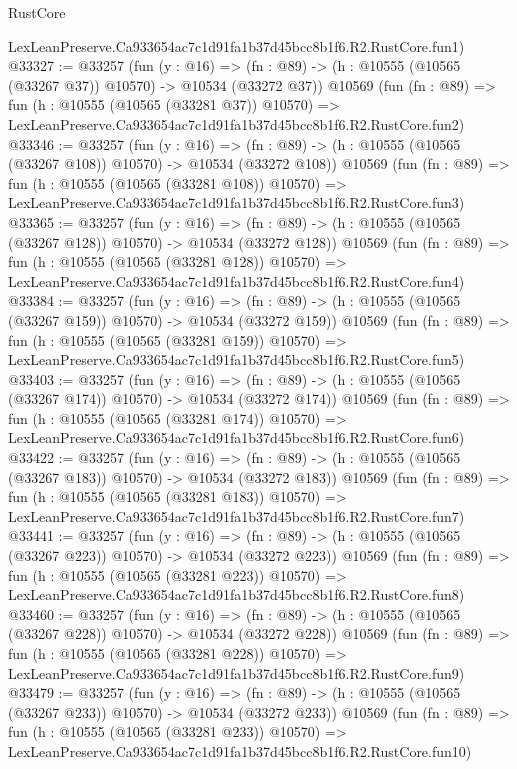 \begin{lexlean}{RustCore}
\begin{coremodule}
    LexLeanPreserve.Ca933654ac7c1d91fa1b37d45bcc8b1f6.R2.RustCore.fun1)
@33327 := @33257
    (fun (y : @16) =>
    (fn : @89) -> (h : @10555 (@10565 (@33267 @37)) @10570) -> @10534 (@33272 @37))
    @10569
    (fun (fn : @89) =>
    fun (h : @10555 (@10565 (@33281 @37)) @10570) =>
    LexLeanPreserve.Ca933654ac7c1d91fa1b37d45bcc8b1f6.R2.RustCore.fun2)
@33346 := @33257
    (fun (y : @16) =>
    (fn : @89) -> (h : @10555 (@10565 (@33267 @108)) @10570) -> @10534 (@33272 @108))
    @10569
    (fun (fn : @89) =>
    fun (h : @10555 (@10565 (@33281 @108)) @10570) =>
    LexLeanPreserve.Ca933654ac7c1d91fa1b37d45bcc8b1f6.R2.RustCore.fun3)
@33365 := @33257
    (fun (y : @16) =>
    (fn : @89) -> (h : @10555 (@10565 (@33267 @128)) @10570) -> @10534 (@33272 @128))
    @10569
    (fun (fn : @89) =>
    fun (h : @10555 (@10565 (@33281 @128)) @10570) =>
    LexLeanPreserve.Ca933654ac7c1d91fa1b37d45bcc8b1f6.R2.RustCore.fun4)
@33384 := @33257
    (fun (y : @16) =>
    (fn : @89) -> (h : @10555 (@10565 (@33267 @159)) @10570) -> @10534 (@33272 @159))
    @10569
    (fun (fn : @89) =>
    fun (h : @10555 (@10565 (@33281 @159)) @10570) =>
    LexLeanPreserve.Ca933654ac7c1d91fa1b37d45bcc8b1f6.R2.RustCore.fun5)
@33403 := @33257
    (fun (y : @16) =>
    (fn : @89) -> (h : @10555 (@10565 (@33267 @174)) @10570) -> @10534 (@33272 @174))
    @10569
    (fun (fn : @89) =>
    fun (h : @10555 (@10565 (@33281 @174)) @10570) =>
    LexLeanPreserve.Ca933654ac7c1d91fa1b37d45bcc8b1f6.R2.RustCore.fun6)
@33422 := @33257
    (fun (y : @16) =>
    (fn : @89) -> (h : @10555 (@10565 (@33267 @183)) @10570) -> @10534 (@33272 @183))
    @10569
    (fun (fn : @89) =>
    fun (h : @10555 (@10565 (@33281 @183)) @10570) =>
    LexLeanPreserve.Ca933654ac7c1d91fa1b37d45bcc8b1f6.R2.RustCore.fun7)
@33441 := @33257
    (fun (y : @16) =>
    (fn : @89) -> (h : @10555 (@10565 (@33267 @223)) @10570) -> @10534 (@33272 @223))
    @10569
    (fun (fn : @89) =>
    fun (h : @10555 (@10565 (@33281 @223)) @10570) =>
    LexLeanPreserve.Ca933654ac7c1d91fa1b37d45bcc8b1f6.R2.RustCore.fun8)
@33460 := @33257
    (fun (y : @16) =>
    (fn : @89) -> (h : @10555 (@10565 (@33267 @228)) @10570) -> @10534 (@33272 @228))
    @10569
    (fun (fn : @89) =>
    fun (h : @10555 (@10565 (@33281 @228)) @10570) =>
    LexLeanPreserve.Ca933654ac7c1d91fa1b37d45bcc8b1f6.R2.RustCore.fun9)
@33479 := @33257
    (fun (y : @16) =>
    (fn : @89) -> (h : @10555 (@10565 (@33267 @233)) @10570) -> @10534 (@33272 @233))
    @10569
    (fun (fn : @89) =>
    fun (h : @10555 (@10565 (@33281 @233)) @10570) =>
    LexLeanPreserve.Ca933654ac7c1d91fa1b37d45bcc8b1f6.R2.RustCore.fun10)

\end{coremodule}
\end{lexlean}
